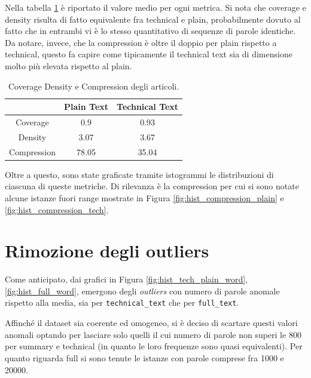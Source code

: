 \documentclass[12pt,a4paper,twoside,openright]{book}
\begin{document}
Nella tabella \ref{tab:cov_dens_compr} è riportato il valore medio per ogni metrica. Si nota che coverage e density risulta di fatto equivalente fra technical e plain, probabilmente dovuto al fatto che in entrambi vi è lo stesso quantitativo di sequenze di parole identiche. Da notare, invece, che la compression è oltre il doppio per plain rispetto a technical, questo fa capire come tipicamente il technical text sia di dimensione molto più elevata rispetto al plain.


\begin{table}
\centering
\begin{tabular}{|c|c|c|}
\hline
            & Plain Text & Technical Text \\ \hline
Coverage    & 0.9        & 0.93           \\ \hline
Density     & 3.07       & 3.67           \\ \hline
Compression & 78.05      & 35.04          \\ \hline
\end{tabular}
\caption{Coverage Density e Compression degli articoli.}
\label{tab:cov_dens_compr}
\end{table}


Oltre a questo, sono state graficate tramite istogrammi le distribuzioni di ciascuna di queste metriche. Di rilevanza è la compression per cui si sono notate alcune istanze fuori range mostrate in Figura \ref{fig:hist_compression_plain} e \ref{fig:hist_compression_tech}.




\section{Rimozione degli outliers}
Come anticipato, dai grafici in Figura \ref{fig:hist_tech_plain_word}, \ref{fig:hist_full_word}, emergono degli \emph{outliers} con numero di parole anomale rispetto alla media, sia per \texttt{technical\_text} che per \texttt{full\_text}. 

Affinché il dataset sia coerente ed omogeneo, si è deciso di scartare questi valori anomali optando per lasciare solo quelli il cui numero di parole non superi le 800 per summary e technical (in quanto le loro frequenze sono quasi equivalenti). Per quanto riguarda full si sono tenute le istanze con parole comprese fra 1000 e 20000.
\end{document}
